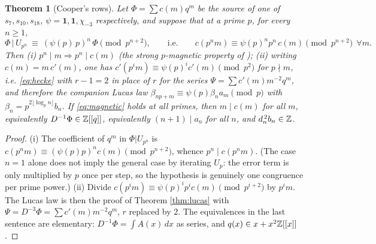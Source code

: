 \documentclass[11pt]{amsart}
\newtheorem{theorem}{Theorem}[section]
\theoremstyle{definition}
\theoremstyle{remark}
\begin{document}
\begin{theorem}[Cooper's rows]\label{thm:cooper}
Let $\Phi=\sum c(m)q^m$ be the source of one of $s_7,s_{10},s_{18}$, $\psi=\mathbf 1,\mathbf 1,\chi_{-3}$ respectively, and suppose that at a prime $p$, for every $n\ge1$,
\begin{equation}\label{eq:magnetic}
\Phi\,|\,U_{p^n}\ \equiv\ (\psi(p)\,p)^n\,\Phi\pmod{p^{n+2}},\qquad\text{i.e.}\qquad c(p^nm)\equiv\psi(p)^np^n\,c(m)\pmod{p^{n+2}}\ \ \forall m .
\end{equation}
Then (i) $p^n\mid m\Rightarrow p^n\mid c(m)$ (the strong $p$-magnetic property of \cite{PasolZudilin}); (ii) writing $c(m)=m\,c'(m)$, one has $c'(p^im)\equiv\psi(p)^ic'(m)\pmod{p^2}$ for $p\nmid m$, i.e. \eqref{eq:hecke} with $r-1=2$ in place of $r$ for the series $\Psi=\sum c'(m)m^{-2}q^m$, and therefore the companion Lucas law $\beta_{np+m}\equiv\psi(p)\beta_na_m\pmod p$ with $\beta_n=p^{2\lfloor\log_pn\rfloor}b_n$. If \eqref{eq:magnetic} holds at all primes, then $m\mid c(m)$ for all $m$, equivalently $D^{-1}\Phi\in\mathbb Z[[q]]$, equivalently $(n+1)\mid a_n$ for all $n$, and $d_n^{\,2}b_n\in\mathbb Z$.
\end{theorem}
\begin{proof}
(i) The coefficient of $q^m$ in $\Phi|U_{p^n}$ is $c(p^nm)\equiv(\psi(p)p)^nc(m)\pmod{p^{n+2}}$, whence $p^n\mid c(p^nm)$. (The case $n=1$ alone does not imply the general case by iterating $U_p$: the error term is only multiplied by $p$ once per step, so the hypothesis is genuinely one congruence per prime power.) (ii) Divide $c(p^im)\equiv\psi(p)^ip^ic(m)\pmod{p^{i+2}}$ by $p^im$. The Lucas law is then the proof of Theorem \ref{thm:lucas} with $\Psi=D^{-3}\Phi=\sum c'(m)m^{-2}q^m$, $r$ replaced by $2$. The equivalences in the last sentence are elementary: $D^{-1}\Phi=\int A(x)\,dx$ as series, and $q(x)\in x+x^2\mathbb Z[[x]]$.
\end{proof}
\end{document}
